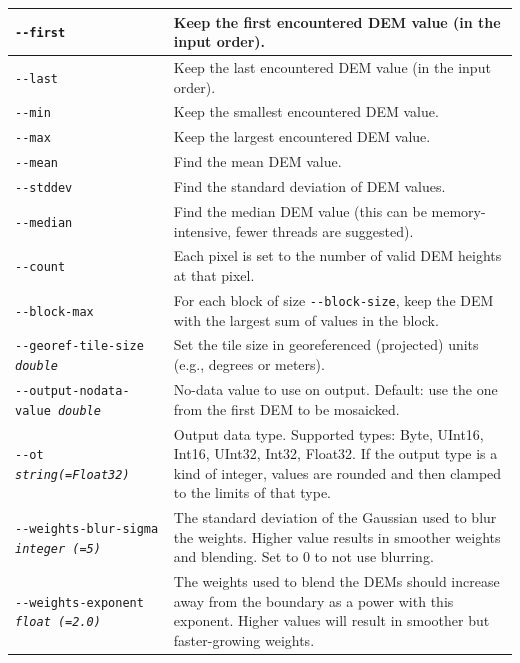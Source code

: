\begin{longtable}{|l|p{10cm}|}
\texttt{-\/-first}
& Keep the first encountered DEM value (in the input order).
\\ \hline

\texttt{-\/-last}
& Keep the last encountered DEM value (in the input order).
\\ \hline

\texttt{-\/-min}
& Keep the smallest encountered DEM value.
\\ \hline

\texttt{-\/-max}
& Keep the largest encountered DEM value.
\\ \hline

\texttt{-\/-mean}
& Find the mean DEM value.
\\ \hline

\texttt{-\/-stddev}
& Find the standard deviation of DEM values.
\\ \hline

\texttt{-\/-median}
& Find the median DEM value (this can be memory-intensive, fewer threads are suggested).
\\ \hline

\texttt{-\/-count}
& Each pixel is set to the number of valid DEM heights at that pixel.
\\ \hline

\texttt{-\/-block-max} & For each block of size \texttt{-\/-block-size}, keep the DEM with the largest sum of values in the block.\\ \hline

\texttt{-\/-georef-tile-size \textit{double}} &
Set the tile size in georeferenced (projected) units (e.g., degrees or meters).
\\ \hline
\texttt{-\/-output-nodata-value \textit{double}} &
No-data value to use on output. Default: use the one from the first DEM to be mosaicked.
\\ \hline

\texttt{-\/-ot \textit{string(=Float32)}} & Output data type. Supported types: Byte, UInt16, Int16, UInt32, Int32, Float32. If the output type is a kind of integer, values are rounded and then clamped to the limits of that type. \\ \hline

\texttt{-\/-weights-blur-sigma \textit{integer (=5)} } &
The standard deviation of the Gaussian used to blur the weights. Higher value results in smoother weights and blending. Set to 0 to not use blurring.
\\ \hline

\texttt{-\/-weights-exponent \textit{float (=2.0)} } &
The weights used to blend the DEMs should increase away from the boundary as a power with this exponent. Higher values will result in smoother but faster-growing weights.
\\ \hline


\end{longtable}
